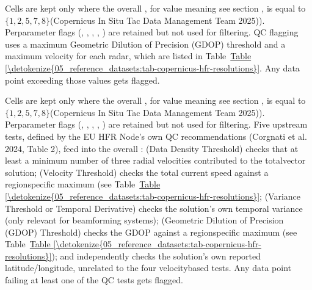 \documentclass[a4paper,10pt,english]{sphinxmanual}
\begin{document}
\sphinxAtStartPar
{}

\sphinxAtStartPar
Cells are kept only where the overall , for value meaning see section {\hyperref[\detokenize{05_reference_datasets:subpar-cmems-insitu}]{}}, is equal to \(\{1,2,5,7,8\}\)(Copernicus In Situ Tac Data Management Team 2025)). Per\sphinxhyphen{}parameter flags (, , , , ) are retained but not used for filtering. QC flagging uses a maximum Geometric Dilution of Precision (GDOP) threshold and a maximum velocity for each radar, which are listed in Table \hyperref[\detokenize{05_reference_datasets:tab-copernicus-hfr-resolutions}]{Table \ref{\detokenize{05_reference_datasets:tab-copernicus-hfr-resolutions}}}. Any data point exceeding those values gets flagged.

\sphinxAtStartPar
{}

\sphinxAtStartPar
Cells are kept only where the overall , for value meaning see section {\hyperref[\detokenize{05_reference_datasets:subpar-cmems-insitu}]{}}, is equal to \(\{1,2,5,7,8\}\)(Copernicus In Situ Tac Data Management Team 2025)). Per\sphinxhyphen{}parameter flags (, , , , ) are retained but not used for filtering. Five upstream tests, defined by the EU HFR Node’s own QC recommendations (Corgnati et al. 2024, Table 2), feed into the overall :  (Data Density Threshold) checks that at least a minimum number of three radial velocities contributed to the total\sphinxhyphen{}vector solution;  (Velocity Threshold) checks the total current speed against a region\sphinxhyphen{}specific maximum (see Table \hyperref[\detokenize{05_reference_datasets:tab-copernicus-hfr-resolutions}]{Table \ref{\detokenize{05_reference_datasets:tab-copernicus-hfr-resolutions}}};  (Variance Threshold or Temporal Derivative) checks the solution’s own temporal variance (only relevant for beam\sphinxhyphen{}forming systems);  (Geometric Dilution of Precision (GDOP) Threshold) checks the GDOP against a region\sphinxhyphen{}specific maximum (see Table \hyperref[\detokenize{05_reference_datasets:tab-copernicus-hfr-resolutions}]{Table \ref{\detokenize{05_reference_datasets:tab-copernicus-hfr-resolutions}}}); and  independently checks the solution’s own reported latitude/longitude, unrelated to the four velocity\sphinxhyphen{}based tests. Any data point failing at least one of the QC tests gets flagged.
\end{document}
